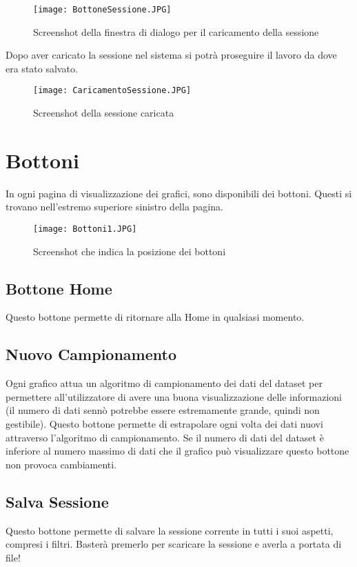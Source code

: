 \begin{figure}[H]
    \texttt{[image: BottoneSessione.JPG]}
    \caption{Screenshot della finestra di dialogo per il caricamento della sessione}
\end{figure}

Dopo aver caricato la sessione nel sistema si potrà proseguire il lavoro da dove era stato salvato.

\begin{figure}[H]
    \texttt{[image: CaricamentoSessione.JPG]}
    \caption{Screenshot della sessione caricata}
\end{figure}

\section{Bottoni}
In ogni pagina di visualizzazione dei grafici, sono disponibili dei bottoni. Questi si trovano nell'estremo superiore sinistro della pagina.

\begin{figure}[H]
    \texttt{[image: Bottoni1.JPG]}
    \caption{Screenshot che indica la posizione dei bottoni}
\end{figure}

\subsection{Bottone Home}
Questo bottone permette di ritornare alla Home in qualsiasi momento.

\subsection{Nuovo Campionamento}
Ogni grafico attua un algoritmo di campionamento dei dati del dataset per permettere all'utilizzatore di avere una buona visualizzazione delle informazioni (il numero di dati sennò potrebbe essere estremamente grande, quindi non gestibile).
Questo bottone permette di estrapolare ogni volta dei dati nuovi attraverso l'algoritmo di campionamento. Se il numero di dati del dataset è inferiore al numero massimo di dati che il grafico può visualizzare questo bottone non provoca cambiamenti.

\subsection{Salva Sessione}
Questo bottone permette di salvare la sessione corrente in tutti i suoi aspetti, compresi i filtri. Basterà premerlo per scaricare la sessione e averla a portata di file!

